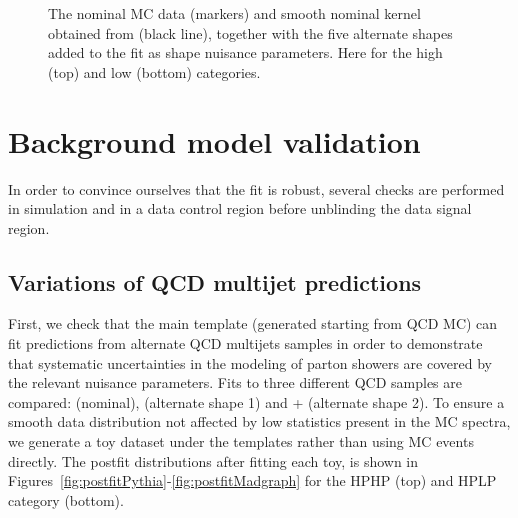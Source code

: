 \begin{figure}[h!]
\caption{The nominal MC data (markers) and smooth nominal kernel obtained from  (black line), together with the five alternate shapes added to the fit as shape nuisance parameters. Here for the high (top) and low (bottom) categories.}
\label{fig:searchIII:sys}
\end{figure}
\clearpage

\section{Background model validation}
\label{sec:search3:checks}
In order to convince ourselves that the fit is robust, several checks are performed in simulation and in a data control region before unblinding the data signal region.

\subsection{Variations of QCD multijet predictions}
First, we check that the main template (generated starting from QCD  MC) can fit predictions from alternate QCD multijets samples in order to demonstrate that systematic uncertainties in the modeling of parton showers are covered by the relevant nuisance parameters. Fits to three different QCD samples are compared:  (nominal), \HERWIG{++} (alternate shape 1) and \MADGRAPH{}+ (alternate shape 2).
To ensure a smooth data distribution not affected by low statistics present in the MC spectra, we generate a toy dataset under the templates rather than using MC events directly. The postfit distributions after fitting each toy, is shown in Figures~\ref{fig:postfitPythia}-\ref{fig:postfitMadgraph} for the HPHP (top) and HPLP category (bottom).
